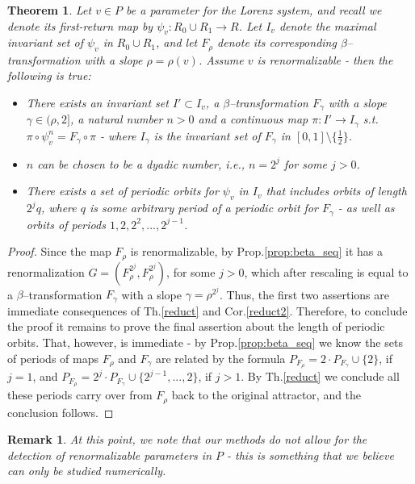 \documentclass[10pt,reqno]{amsart}
\theoremstyle{plain}
\theoremstyle{assumption}
\theoremstyle{notation}
\theoremstyle{claim}
\theoremstyle{conj}
\newtheorem{remark}{\textbf{Remark}}[section]
\theoremstyle{theorem}
\newtheorem{theorem}{Theorem}[section]
\theoremstyle{proposition}
\theoremstyle{corollary}
\begin{document}
\begin{theorem}
    \label{renormth}
   Let $v\in P$ be a parameter for the Lorenz system, and  recall we denote its first-return map by $\psi_v:R_0\cup R_1\to R$. Let $I_v$ denote the maximal invariant set of $\psi_v$ in $R_0\cup R_1$, and let $F_\rho$ denote its corresponding $\beta$--transformation with a slope $\rho=\rho(v)$. Assume $v$ is renormalizable - then the following is true:
   \begin{itemize}
       \item There exists an invariant set $I'\subset I_v$, a $\beta$--transformation $F_\gamma$ with a slope $\gamma\in(\rho,2]$, a natural number $n>0$ and a continuous map $\pi:I'\to I_\gamma$ s.t. $\pi\circ \psi^n_v=F_\gamma\circ\pi$ - where $I_\gamma$ is the invariant set of $F_\gamma$ in $[0,1]\setminus\{\frac{1}{2}\}$.
       \item $n$ can be chosen to be a dyadic number, i.e., $n=2^j$ for some $j>0$.
   \item There exists a set of periodic orbits for $\psi_v$ in $I_v$ that includes orbits of length $2^j q$, where $q$ is some arbitrary period of a periodic orbit for $F_\gamma$ - as well as orbits of periods $1,2,2^2,...,2^{j-1}$.
   \end{itemize}
\end{theorem}
\begin{proof}
    Since the map $F_{\rho}$ is renormalizable, by Prop.\ref{prop:beta_seq} it has a renormalization $G=(F_\rho^{2^j},F_\rho^{2^j})$, for some $j>0$, which after rescaling is equal to a $\beta$--transformation  $F_\gamma$ with a slope $\gamma=\rho^{2^j}$. Thus, the first two assertions are immediate consequences of Th.\ref{reduct} and Cor.\ref{reduct2}. Therefore, to conclude the proof it remains to prove the final assertion about the length of periodic orbits. That, however, is immediate - by Prop.\ref{prop:beta_seq} we know the sets of periods of maps $F_\rho$ and $F_\gamma$ are related by the formula $P_{F_{\rho}}=2\cdot P_{F_\gamma}\cup\{2\}$, if $j=1$,
    and
    $P_{F_\rho}=2^j\cdot P_{F_\gamma}\cup\{ 2^{j-1},...,2\}$, if $j>1$. By Th.\ref{reduct} we conclude all these periods carry over from $F_\rho$ back to the original attractor, and the conclusion follows.
\end{proof}
\begin{remark}
    At this point, we note that our methods do not allow for the detection of renormalizable parameters in $P$ - this is something that we  believe can only be studied numerically. 
\end{remark}
\end{document}
